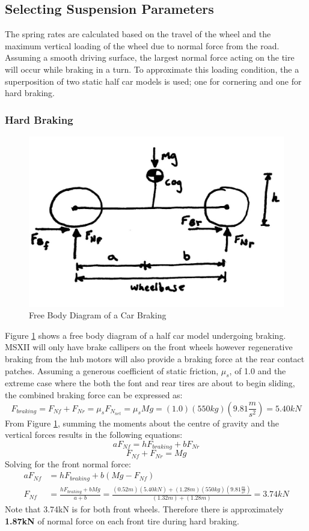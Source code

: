 \documentclass[12pt]{article}
\begin{document}
\subsection{Selecting Suspension Parameters}
\label{sec:paramSelection}
The spring rates are calculated based on the travel of the wheel and the maximum vertical loading of the wheel due to normal force from the road. Assuming a smooth driving surface, the largest normal force acting on the tire will occur while braking in a turn. To approximate this loading condition, the a superposition of two static half car models is used; one for cornering and one for hard braking.  
\subsubsection{Hard Braking}\begin{figure}[h!]
	\centering
	\includegraphics[width=.5\textwidth]{./LaTex/brakingFBD.jpg}
	\caption{Free Body Diagram of a Car Braking}
	\label{fig:barkingFBD}
\end{figure}
Figure \ref{fig:barkingFBD} shows a free body diagram of a half car model undergoing braking. MSXII will only have brake callipers on the front wheels however regenerative braking from the hub motors will also provide a braking force at the rear contact patches. Assuming a generous coefficient of static friction, $\mu _s$, of 1.0 and the extreme case where the both the font and rear tires are about to begin sliding, the combined braking force can be expressed as: 
\begin{equation}
	F_{braking} = F_{Nf} + F_{Nr} = \mu _s F_{N_{net}} =  \mu _s Mg = (1.0)(550kg)\left(9.81\frac{m}{s^2}\right) = 5.40kN
\end{equation}
From Figure \ref{fig:barkingFBD}, summing the moments about the centre of gravity and the vertical forces results in the following equations: 
\begin{equation}
	aF_{Nf} = hF_{braking} + bF_{Nr}
\end{equation}
\begin{equation}
	F_{Nf} + F_{Nr} = Mg
\end{equation}
Solving for the front normal force: 
\begin{equation}
\begin{split}
	aF_{Nf} &= hF_{braking} + b(Mg - F_{Nf})\\
	F_{Nf} &= \frac{hF_{braking} + bMg}{a+b} = \frac{(0.52m)(5.40kN)+(1.28m)(550kg)\left(9.81\frac{m}{s^2}\right)}{(1.32m)+(1.28m)} = 3.74kN
\end{split}
\end{equation}
Note that 3.74kN is for both front wheels. Therefore there is approximately \textbf{1.87kN} of normal force on each front tire during hard braking. 
\end{document}
